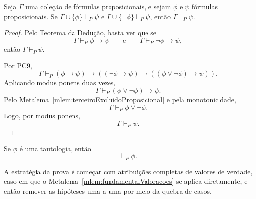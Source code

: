 \begin{metalemma}\label{mlem:quebraDeCasosProposicional}
    Seja $\Gamma$ uma coleção de fórmulas proposicionais, e sejam $\phi$ e $\psi$ fórmulas proposicionais.
    Se $\Gamma\cup\{\phi\}\vdash_P \psi$ e $\Gamma\cup\{\neg \phi\}\vdash_P \psi$, então $\Gamma\vdash_P \psi$.
\end{metalemma}
\begin{proof}
    Pelo Teorema da Dedução, basta ver que se
    \[
        \Gamma\vdash_P \phi\rightarrow\psi
        \qquad\text{e}\qquad
        \Gamma\vdash_P \neg\phi\rightarrow\psi,
    \]
    então $\Gamma\vdash_P \psi$.

    Por PC9,
    \[
        \Gamma\vdash_P
        (\phi\rightarrow\psi)\rightarrow((\neg\phi\rightarrow\psi)\rightarrow((\phi\vee\neg\phi)\rightarrow\psi)).
    \]
    Aplicando modus ponens duas vezes,
    \[
        \Gamma\vdash_P (\phi\vee\neg\phi)\rightarrow\psi.
    \]
    Pelo Metalema~\ref{mlem:terceiroExcluidoProposicional} e pela monotonicidade,
    \[
        \Gamma\vdash_P \phi\vee\neg\phi.
    \]
    Logo, por modus ponens,
    \[
        \Gamma\vdash_P \psi.
    \]
\end{proof}
\begin{metatheorem}\label{thm:tautologiasSaoTeoremas}
    Se $\phi$ é uma tautologia, então
    \[
        \vdash_P \phi.
    \]
\end{metatheorem}
A estratégia da prova é começar com atribuições completas de valores de verdade, caso em que o Metalema~\ref{mlem:fundamentalValoracoes} se aplica diretamente, e então remover as hipóteses uma a uma por meio da quebra de casos.
